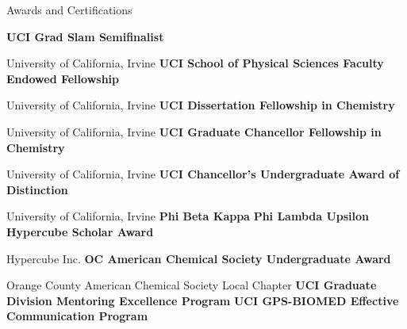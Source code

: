 \begin{rubric}{Awards and Certifications}

  \entry*[Feb 2022] \textbf{UCI Grad Slam Semifinalist}
  
  University of California, Irvine
  \entry*[Jun 2021] \textbf{UCI School of Physical Sciences Faculty Endowed Fellowship}

  University of California, Irvine
  \entry*[Jun 2021] \textbf{UCI Dissertation Fellowship in Chemistry}
  
  University of California, Irvine
  \entry*[Sept 2016] \textbf{UCI Graduate Chancellor Fellowship in Chemistry}
  
  University of California, Irvine
  \entry*[Jun 2015] \textbf{UCI Chancellor's Undergraduate Award of Distinction}
  
  University of California, Irvine
  \entry*[May 2015] \textbf{Phi Beta Kappa}
  \entry*[May 2015] \textbf{Phi Lambda Upsilon}
  \entry*[Jun 2014] \textbf{Hypercube Scholar Award}
  
  Hypercube Inc.
  \entry*[Apr 2014] \textbf{OC American Chemical Society Undergraduate Award}
  
  Orange County American Chemical Society Local Chapter
  \entry*[Mar 2020] \textbf{UCI Graduate Division Mentoring Excellence Program}
  \entry*[Jun 2017] \textbf{UCI GPS-BIOMED Effective Communication Program} 
\end{rubric}
